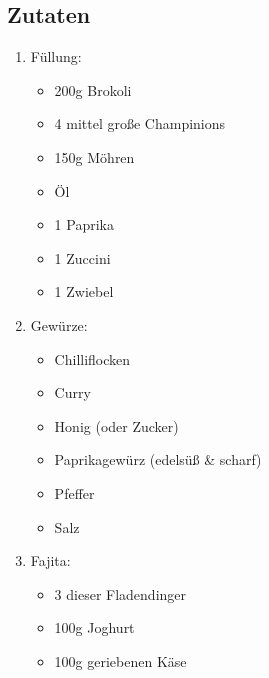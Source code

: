   \subsection*{Zutaten}
    \begin{enumerate} 
      \item Füllung:
      \begin{itemize}
        \item 200g Brokoli
        \item 4 mittel große Champinions
        \item 150g Möhren
        \item Öl
        \item 1 Paprika
        \item 1 Zuccini
        \item 1 Zwiebel
      \end{itemize}
      \item Gewürze:
      \begin{itemize}
        \item Chilliflocken
        \item Curry
        \item Honig (oder Zucker)
        \item Paprikagewürz (edelsüß \& scharf)
        \item Pfeffer
        \item Salz
      \end{itemize}
      \item Fajita:
      \begin{itemize}
        \item 3 dieser Fladendinger
        \item 100g Joghurt
        \item 100g geriebenen Käse
      \end{itemize}
    \end{enumerate}

